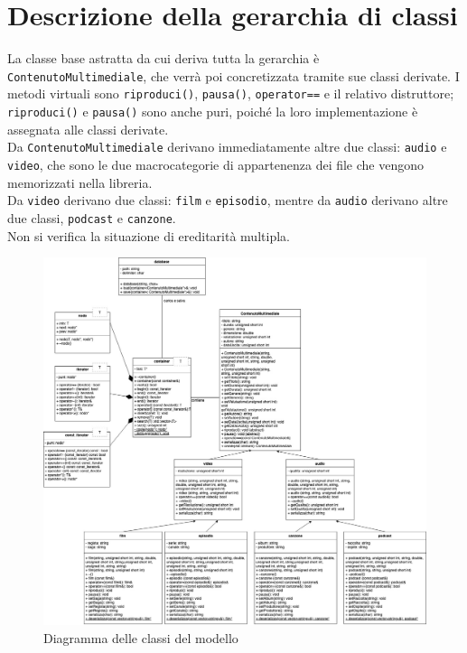 \documentclass[a4paper,10pt]{article}
\begin{document}
\section{Descrizione della gerarchia di classi}

La classe base astratta da cui deriva tutta la gerarchia è \texttt{ContenutoMultimediale}, che verrà poi concretizzata tramite sue classi derivate. I metodi virtuali sono \texttt{riproduci()}, \texttt{pausa()}, \texttt{operator==} e il relativo distruttore; \texttt{riproduci()} e \texttt{pausa()} sono anche puri, poiché la loro implementazione è assegnata alle classi derivate. \\
Da \texttt{ContenutoMultimediale} derivano immediatamente altre due classi: \texttt{audio} e \texttt{video}, che sono le due macrocategorie di appartenenza dei file che vengono memorizzati nella libreria. \\
Da \texttt{video} derivano due classi: \texttt{film} e \texttt{episodio}, mentre da \texttt{audio} derivano altre due classi, \texttt{podcast} e \texttt{canzone}. \\
Non si verifica la situazione di ereditarità multipla. \\
\begin{figure}[H]
	\begin{center}
		\includegraphics[width=\textwidth,keepaspectratio]{uml.jpg}
	\end{center}
	\caption{\label{fig:my-label} Diagramma delle classi del modello}
\end{figure}
\end{document}
